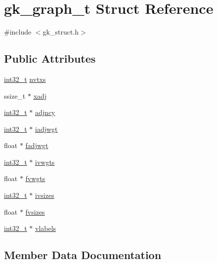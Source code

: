 \hypertarget{a00638}{}\section{gk\+\_\+graph\+\_\+t Struct Reference}
\label{a00638}


{\ttfamily \#include $<$gk\+\_\+struct.\+h$>$}

\subsection*{Public Attributes}
\begin{DoxyCompactItemize}
\item 
\hyperlink{a00119_a37994e3b11c72957c6f454c6ec96d43d}{int32\+\_\+t} \hyperlink{a00638_adf27e7e36c8ba4cc586bd37b303db330}{nvtxs}
\item 
ssize\+\_\+t $\ast$ \hyperlink{a00638_a4ab46970ef24e35f54e8ae6b3c15662f}{xadj}
\item 
\hyperlink{a00119_a37994e3b11c72957c6f454c6ec96d43d}{int32\+\_\+t} $\ast$ \hyperlink{a00638_ac6f82b6550328643c2d64503e7349af4}{adjncy}
\item 
\hyperlink{a00119_a37994e3b11c72957c6f454c6ec96d43d}{int32\+\_\+t} $\ast$ \hyperlink{a00638_aa5c9adf88207adf2bd0cc100042f335b}{iadjwgt}
\item 
float $\ast$ \hyperlink{a00638_a96d4bbf3a3f9958549d53160d6f6d3aa}{fadjwgt}
\item 
\hyperlink{a00119_a37994e3b11c72957c6f454c6ec96d43d}{int32\+\_\+t} $\ast$ \hyperlink{a00638_a25cd4970e41c3ee0bc919b93c9319023}{ivwgts}
\item 
float $\ast$ \hyperlink{a00638_a900444f2ba7d2ecaf89591f85c849991}{fvwgts}
\item 
\hyperlink{a00119_a37994e3b11c72957c6f454c6ec96d43d}{int32\+\_\+t} $\ast$ \hyperlink{a00638_af90840fb29404bc157231c3975dbc99f}{ivsizes}
\item 
float $\ast$ \hyperlink{a00638_ab43a62e6f11f9cd20c5b6b7d3d02bb0e}{fvsizes}
\item 
\hyperlink{a00119_a37994e3b11c72957c6f454c6ec96d43d}{int32\+\_\+t} $\ast$ \hyperlink{a00638_a720b0b3ecc66fcd7b1f3f280aaf074b4}{vlabels}
\end{DoxyCompactItemize}


\subsection{Member Data Documentation}
\mbox{\label{a00638_ac6f82b6550328643c2d64503e7349af4}} 

